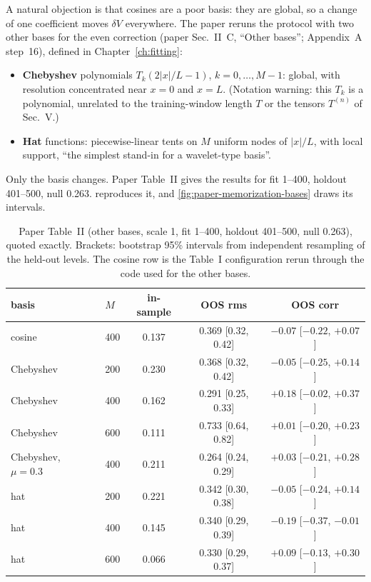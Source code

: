 A natural objection is that cosines are a poor basis: they are global, so a change of one coefficient moves $\delta V$ everywhere. The paper reruns the protocol with two other bases for the even correction (paper Sec.~II~C, ``Other bases''; Appendix~A step~16), defined in Chapter~\ref{ch:fitting}:
\begin{itemize}
\item \textbf{Chebyshev} polynomials $T_k(2|x|/L-1)$, $k=0,\dots,M-1$: global, with resolution concentrated near $x=0$ and $x=L$. (Notation warning: this $T_k$ is a polynomial, unrelated to the training-window length $T$ or the tensors $T^{(n)}$ of Sec.~V.)
\item \textbf{Hat} functions: piecewise-linear tents on $M$ uniform nodes of $|x|/L$, with local support, ``the simplest stand-in for a wavelet-type basis''.
\end{itemize}
Only the basis changes. Paper Table~II gives the results for fit 1--400, holdout 401--500, null 0.263.  reproduces it, and \cref{fig:paper-memorization-bases} draws its intervals.

\begin{table}[htbp]\centering
\caption{Paper Table~II (other bases, scale 1, fit 1--400, holdout 401--500, null 0.263), quoted exactly. Brackets: bootstrap 95\% intervals from independent resampling of the held-out levels. The cosine row is the Table~I configuration rerun through the code used for the other bases.}
\label{tab:paper-memorization-tableII}
\small
\begin{tabular}{llccc}
\toprule
basis & $M$ & in-sample & OOS rms & OOS corr \\
\midrule
cosine & 400 & 0.137 & 0.369 [0.32, 0.42] & $-0.07$ [$-0.22$, $+0.07$] \\
Chebyshev & 200 & 0.230 & 0.368 [0.32, 0.42] & $-0.05$ [$-0.25$, $+0.14$] \\
Chebyshev & 400 & 0.162 & 0.291 [0.25, 0.33] & $+0.18$ [$-0.02$, $+0.37$] \\
Chebyshev & 600 & 0.111 & 0.733 [0.64, 0.82] & $+0.01$ [$-0.20$, $+0.23$] \\
Chebyshev, $\mu=0.3$ & 400 & 0.211 & 0.264 [0.24, 0.29] & $+0.03$ [$-0.21$, $+0.28$] \\
hat & 200 & 0.221 & 0.342 [0.30, 0.38] & $-0.05$ [$-0.24$, $+0.14$] \\
hat & 400 & 0.145 & 0.340 [0.29, 0.39] & $-0.19$ [$-0.37$, $-0.01$] \\
hat & 600 & 0.066 & 0.330 [0.29, 0.37] & $+0.09$ [$-0.13$, $+0.30$] \\
\bottomrule
\end{tabular}
\end{table}

